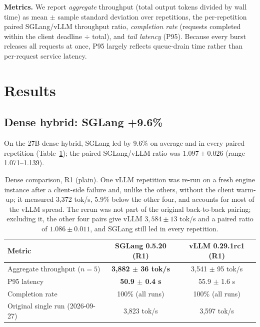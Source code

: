 \documentclass[11pt]{article}
\newcommand{\tps}{tok/s\xspace}
\begin{document}
\textbf{Metrics.} We report \emph{aggregate} throughput (total output tokens divided by wall time) as mean $\pm$ sample standard deviation over repetitions, the per-repetition paired SGLang/vLLM throughput ratio, \emph{completion rate} (requests completed within the client deadline $\div$ total), and \emph{tail latency} (P95). Because every burst releases all requests at once, P95 largely reflects queue-drain time rather than per-request service latency.

\section{Results}

\subsection{Dense hybrid: SGLang +9.6\%}
\label{sec:dense}

On the 27B dense hybrid, SGLang led by 9.6\% on average and in every paired repetition (Table~\ref{tab:dense-r1}); the paired SGLang/vLLM ratio was $1.097 \pm 0.026$ (range 1.071--1.139).

\begin{table}[t]
\centering
\begin{tabular}{lcc}
\toprule
\textbf{Metric} & \textbf{SGLang 0.5.20 (R1)} & \textbf{vLLM 0.29.1rc1 (R1)} \\
\midrule
Aggregate throughput ($n=5$) & \textbf{3,882 $\pm$ 36 \tps} & 3,541 $\pm$ 95 \tps \\
P95 latency & \textbf{50.9 $\pm$ 0.4 s} & 55.9 $\pm$ 1.6 s \\
Completion rate & 100\% (all runs) & 100\% (all runs) \\
Original single run (2026-09-27) & 3,823 \tps & 3,597 \tps \\
\bottomrule
\end{tabular}
\caption{Dense comparison, R1 (plain). One vLLM repetition was re-run on a fresh engine instance after a client-side failure and, unlike the others, without the client warm-up; it measured 3,372 \tps, 5.9\% below the other four, and accounts for most of the vLLM spread. The rerun was not part of the original back-to-back pairing; excluding it, the other four pairs give vLLM $3{,}584 \pm 13$ \tps{} and a paired ratio of $1.086 \pm 0.011$, and SGLang still led in every repetition.}
\label{tab:dense-r1}
\end{table}
\end{document}
